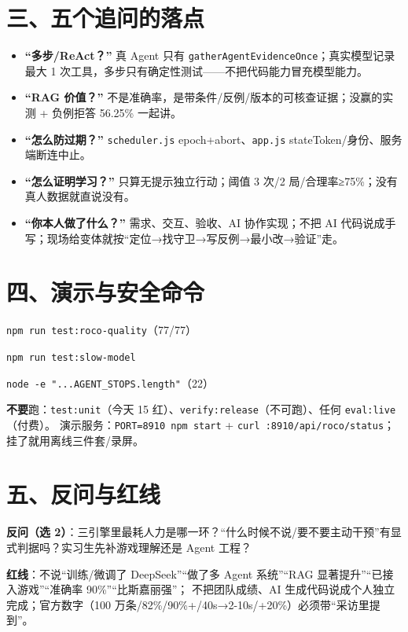 \documentclass[10pt,a4paper,fontset=fandol]{ctexart}
\begin{document}
\section*{三、五个追问的落点}
\begin{itemize}
\item \textbf{“多步/ReAct？”} 真 Agent 只有 \texttt{gatherAgentEvidenceOnce}；真实模型记录最大 1 次工具，多步只有确定性测试——不把代码能力冒充模型能力。
\item \textbf{“RAG 价值？”} 不是准确率，是带条件/反例/版本的可核查证据；没赢的实测 + 负例拒答 56.25\% 一起讲。
\item \textbf{“怎么防过期？”} \texttt{scheduler.js} epoch+abort、\texttt{app.js} stateToken/身份、服务端断连中止。
\item \textbf{“怎么证明学习？”} 只算无提示独立行动；阈值 3 次/2 局/合理率≥75\%；没有真人数据就直说没有。
\item \textbf{“你本人做了什么？”} 需求、交互、验收、AI 协作实现；不把 AI 代码说成手写；现场给变体就按“定位→找守卫→写反例→最小改→验证”走。
\end{itemize}

\section*{四、演示与安全命令}
{\small
\texttt{npm run test:roco-quality}（77/77）\par
\texttt{npm run test:slow-model}\par
\texttt{node -e "...AGENT\_STOPS.length"}（22）\par
\textbf{不要}跑：\texttt{test:unit}（今天 15 红）、\texttt{verify:release}（不可跑）、任何 \texttt{eval:live}（付费）。
演示服务：\texttt{PORT=8910 npm start} + \texttt{curl :8910/api/roco/status}；挂了就用离线三件套/录屏。\par}

\section*{五、反问与红线}
\textbf{反问（选 2）}：三引擎里最耗人力是哪一环？\quad “什么时候不说/要不要主动干预”有显式判据吗？\quad 实习生先补游戏理解还是 Agent 工程？\par
\textbf{红线}：不说“训练/微调了 DeepSeek”“做了多 Agent 系统”“RAG 显著提升”“已接入游戏”“准确率 90\%”“比斯嘉丽强”；
不把团队成绩、AI 生成代码说成个人独立完成；官方数字（100 万条/82\%/90\%+/40s→2-10s/+20\%）必须带“采访里提到”。
\end{document}
